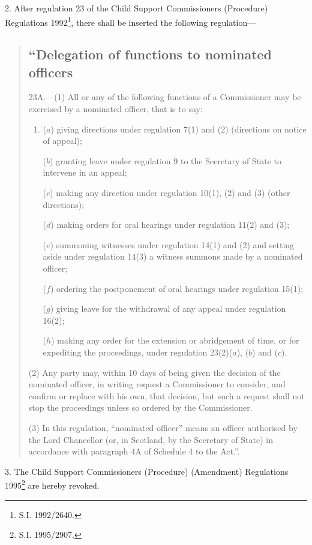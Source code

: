 \documentclass[a4paper]{article}
\begin{document}
2.  After regulation 23 of the Child Support Commissioners (Procedure) Regulations 1992\footnote{\frenchspacing S.I. 1992/2640.}, there shall be inserted the following regulation—
\begin{quotation}
\subsection*{“Delegation of functions to nominated officers}

23A.—(1) All or any of the following functions of a Commissioner may be exercised by a nominated officer, that is to say:
\begin{enumerate}\item[]
($a$) giving directions under regulation 7(1) and (2) (directions on notice of appeal);

($b$) granting leave under regulation 9 to the Secretary of State to intervene in an appeal;

($c$) making any direction under regulation 10(1), (2) and (3) (other directions);

($d$) making orders for oral hearings under regulation 11(2) and (3);

($e$) summoning witnesses under regulation 14(1) and (2) and setting aside under regulation 14(3) a witness summons made by a nominated officer;

($f$) ordering the postponement of oral hearings under regulation 15(1);

($g$) giving leave for the withdrawal of any appeal under regulation 16(2);

($h$) making any order for the extension or abridgement of time, or for expediting the proceedings, under regulation 23(2)($a$), ($b$) and ($c$).
\end{enumerate}

(2) Any party may, within 10 days of being given the decision of the nominated officer, in writing request a Commissioner to consider, and confirm or replace with his own, that decision, but such a request shall not stop the proceedings unless so ordered by the Commissioner.

(3) In this regulation, “nominated officer” means an officer authorised by the Lord Chancellor (or, in Scotland, by the Secretary of State) in accordance with paragraph 4A of Schedule 4 to the Act.”.
\end{quotation}

\medskip

3.  The Child Support Commissioners (Procedure) (Amendment) Regulations 1995\footnote{\frenchspacing S.I. 1995/2907.} are hereby revoked.
\end{document}
